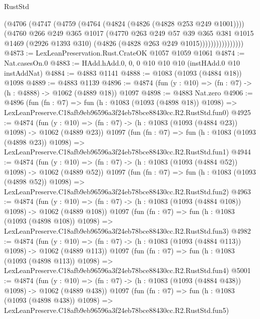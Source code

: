 \begin{lexlean}{RustStd}
\begin{coremodule}
                      (@4706
                        (@4747
                          (@4759
                            (@4764 (@4824 (@4826 (@4828 @253 @249 @1001))))
                            (@4760
                              @266
                              @249
                              @365
                              @1017
                              (@4770
                                @263
                                @249
                                @57
                                @39
                                @365
                                @381
                                @1015
                                @1469
                                (@2926 @1393 @310)
                                (@4826 (@4828 @263 @249 @1015))))))))))))))))
@4873 := LexLeanPreservation.Rust.CrateOK @1057 @1059 @1061
@4874 := Nat.casesOn.{0}
@4883 := HAdd.hAdd.{0, 0, 0} @10 @10 @10 (instHAdd.{0} @10 instAddNat)
@4884 := @4883 @1141
@4888 := @1083 (@1093 (@4884 @18)) @1098
@4889 := @4883 @1139
@4896 := @4874 (fun (y : @10) => (fn : @7) -> (h : @4888) -> @1062 (@4889 @18)) @1097
@4898 := @4883 Nat.zero
@4906 := @4896
    (fun (fn : @7) =>
    fun (h : @1083 (@1093 (@4898 @18)) @1098) =>
    LexLeanPreserve.C18afb9eb96596a3f24eb78bce88430cc.R2.RustStd.fun0)
@4925 := @4874
    (fun (y : @10) => (fn : @7) -> (h : @1083 (@1093 (@4884 @23)) @1098) -> @1062 (@4889 @23))
    @1097
    (fun (fn : @7) =>
    fun (h : @1083 (@1093 (@4898 @23)) @1098) =>
    LexLeanPreserve.C18afb9eb96596a3f24eb78bce88430cc.R2.RustStd.fun1)
@4944 := @4874
    (fun (y : @10) => (fn : @7) -> (h : @1083 (@1093 (@4884 @52)) @1098) -> @1062 (@4889 @52))
    @1097
    (fun (fn : @7) =>
    fun (h : @1083 (@1093 (@4898 @52)) @1098) =>
    LexLeanPreserve.C18afb9eb96596a3f24eb78bce88430cc.R2.RustStd.fun2)
@4963 := @4874
    (fun (y : @10) => (fn : @7) -> (h : @1083 (@1093 (@4884 @108)) @1098) -> @1062 (@4889 @108))
    @1097
    (fun (fn : @7) =>
    fun (h : @1083 (@1093 (@4898 @108)) @1098) =>
    LexLeanPreserve.C18afb9eb96596a3f24eb78bce88430cc.R2.RustStd.fun3)
@4982 := @4874
    (fun (y : @10) => (fn : @7) -> (h : @1083 (@1093 (@4884 @113)) @1098) -> @1062 (@4889 @113))
    @1097
    (fun (fn : @7) =>
    fun (h : @1083 (@1093 (@4898 @113)) @1098) =>
    LexLeanPreserve.C18afb9eb96596a3f24eb78bce88430cc.R2.RustStd.fun4)
@5001 := @4874
    (fun (y : @10) => (fn : @7) -> (h : @1083 (@1093 (@4884 @438)) @1098) -> @1062 (@4889 @438))
    @1097
    (fun (fn : @7) =>
    fun (h : @1083 (@1093 (@4898 @438)) @1098) =>
    LexLeanPreserve.C18afb9eb96596a3f24eb78bce88430cc.R2.RustStd.fun5)

\end{coremodule}
\end{lexlean}
